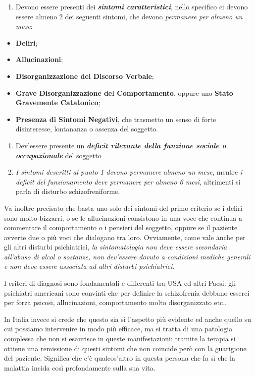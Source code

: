 \documentclass[]{article}
\begin{document}
\begin{enumerate}
\def\labelenumi{\arabic{enumi}.}
\item
  Devono essere presenti dei \textbf{\emph{sintomi caratteristici}},
  nello specifico ci devono essere almeno 2 dei seguenti sintomi, che
  devono \emph{permanere per almeno un mese}:
\end{enumerate}

\begin{itemize}
\item
  \textbf{Deliri};
\item
  \textbf{Allucinazioni};
\item
  \textbf{Disorganizzazione del Discorso Verbale};
\item
  \textbf{Grave Disorganizzazione del Comportamento}, oppure uno
  \textbf{Stato Gravemente Catatonico};
\item
  \textbf{Presenza di Sintomi Negativi}, che trasmetto un senso di forte
  disinteresse, lontananza o assenza del soggetto.
\end{itemize}

\begin{enumerate}
\def\labelenumi{\arabic{enumi}.}
\item
  Dev'essere presente un \textbf{\emph{deficit rilevante della funzione
  sociale o occupazionale}} del soggetto
\item
  \emph{I sintomi descritti al punto 1 devono permanere almeno un mese},
  mentre \emph{i deficit del funzionamento deve permanere per almeno 6
  mesi}, altrimenti si parla di disturbo schizofreniforme.
\end{enumerate}

Va inoltre precisato che basta uno solo dei sintomi del primo criterio
se i deliri sono molto bizzarri, o se le allucinazioni consistono in una
voce che continua a commentare il comportamento o i pensieri del
soggetto, oppure se il paziente avverte due o più voci che dialogano tra
loro. Ovviamente, come vale anche per gli altri disturbi psichiatrici,
\emph{la sintomatologia non deve essere secondaria all'abuso di alcol o
sostanze, non dev'essere dovuto a condizioni mediche generali e non deve
essere associata ad altri disturbi psichiatrici}.

I criteri di diagnosi sono fondamentali e differenti tra USA ed altri
Paesi: gli psichiatri americani sono convinti che per definire la
schizofrenia debbano esserci per forza psicosi, allucinazioni,
comportamento molto disorganizzato etc..

In Italia invece si crede che questo sia sì l'aspetto più evidente ed
anche quello su cui possiamo intervenire in modo più efficace, ma si
tratta di una patologia complessa che non si esaurisce in queste
manifestazioni: tramite la terapia si ottiene una remissione di questi
sintomi che non coincide però con la guarigione del paziente. Significa
che c'è qualcos'altro in questa persona che fa sì che la malattia incida
così profondamente sulla sua vita.
\end{document}
